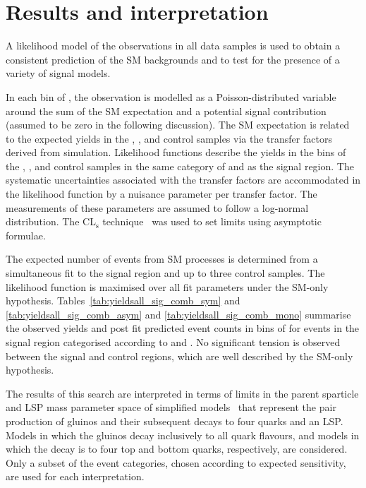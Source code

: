 \section{Results and interpretation}
\label{sec:interpretation}

A likelihood model of the observations in all data samples is
used to obtain a consistent prediction of the SM backgrounds and to
test for the presence of a variety of signal models.

In each bin of \scalht, the observation is modelled as a
Poisson-distributed variable around the sum of the SM expectation and a
potential signal contribution (assumed to be zero in the following
discussion). The SM expectation is related to the expected yields in
the \mj, \mmj, and \gj control samples via the transfer factors
derived from simulation. Likelihood functions describe the yields in the \scalht bins
of the \mj, \mmj, and \gj control samples in the same category of
\njet and \nb as the signal region. The systematic uncertainties
associated with the transfer factors are accommodated in the
likelihood function by a nuisance parameter per transfer factor. The
measurements of these parameters are assumed to follow a log-normal
distribution. The CL$_{\mathrm{s}}$ technique~\cite{read, Cowan:2010js} was used to set limits using asymptotic formulae.

The expected number of events from SM processes is determined from a
simultaneous fit to the signal region and up to three control
samples. The likelihood function is maximised over all fit parameters
under the SM-only hypothesis.
Tables~\ref{tab:yieldsall_sig_comb_sym} and \ref{tab:yieldsall_sig_comb_asym} and
\ref{tab:yieldsall_sig_comb_mono} summarise
the observed yields and post fit predicted event counts in bins of \scalht for events
in the signal region categorised according to \njet and \nb. 
No significant tension is observed between the signal and control
regions, which are well described by the SM-only hypothesis.




\clearpage


The results of this search are interpreted in terms of limits in the
parent sparticle and LSP mass parameter space of simplified
models~\cite{Alwall:2008ag, Alwall:2008va, sms} that represent the pair production of gluinos and their subsequent decays to four quarks 
and an LSP. Models in which the gluinos decay inclusively to all quark flavours, and models in which the decay is to four top and bottom quarks, respectively, are considered. 
Only a subset of the event categories, chosen according to expected sensitivity, are used for
each interpretation. 

